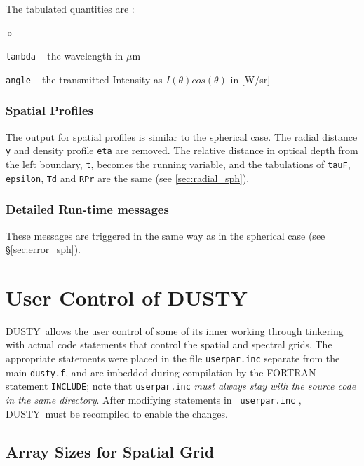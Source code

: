 \documentclass[11pt]{article}
\def\D    {{\sf DUSTY}}
\def\mic    {\hbox{$\mu$m}}
\begin{document}
The tabulated quantities are :
\begin{list}{$\diamond$}{}
\item {\tt lambda} -- the wavelength in \mic
\item {\tt angle} -- the transmitted Intensity as $I(\theta)
  cos(\theta)$ in [W/sr]
\end{list}


\subsubsection{Spatial Profiles}
\label{sec:spatial_slb}

The output for spatial profiles is similar to the spherical case. The
radial distance {\tt y} and density profile {\tt eta} are removed. The
relative distance in optical depth from the left boundary, {\tt t},
becomes the running variable, and the tabulations of {\tt tauF}, {\tt
  epsilon}, {\tt Td} and {\tt RPr} are the same (see
\ref{sec:radial_sph}).



\subsubsection{Detailed Run-time messages}
\label{sec:error_slb}

These messages are triggered in the same way as in the spherical case
(see \S\ref{sec:error_sph}).


\section{User Control of \D}
\label{sec:user_control}

\D\ allows the user control of some of its inner working through
tinkering with actual code statements that control the spatial and
spectral grids. The appropriate statements were placed in the file
{\tt userpar.inc} separate from the main {\tt dusty.f}, and are
imbedded during compilation by the FORTRAN statement {\tt INCLUDE};
note that {\tt userpar.inc} \emph{must always stay with the source
  code in the same directory}. After modifying statements in {\tt
  userpar.inc} , \D\ must be recompiled to enable the changes.

\subsection{Array Sizes for Spatial Grid}
\label{Memory}
\end{document}
